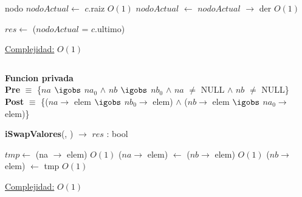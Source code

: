 \begin{Algoritmos}
\begin{algorithm}[H]
\begin{algorithmic}[1]
    \State nodo $nodoActual \gets$ $c$.raiz \Comment $O(1)$
        $nodoActual$ $\gets$ $nodoActual$ $\rightarrow$ der \Comment $O(1)$
    \EndWhile

    \State $res \gets$ ($nodoActual$ = $c$.ultimo)

    \medskip
    \Statex \underline{Complejidad:} $O(1)$
\end{algorithmic}
\end{algorithm}


$ $\newline

\textbf{Funcion privada}\\
\textbf{Pre} $\equiv$ \{$na$ $\igobs$ $na_0$ $\land$ $nb$ $\igobs$ $nb_0$ $\land$ $na$ $\neq$ NULL $\land$ $nb$ $\neq$ NULL\}\\%
\textbf{Post} $\equiv$ \{($na \to$ elem $\igobs$ $nb_0 \to$ elem) $\land$ ($nb \to$ elem $\igobs$ $na_0 \to$ elem)\}%
\begin{algorithm}[H]
{\textbf{iSwapValores}(, ) $\to$ $res$ : bool}
\begin{algorithmic}[1]

    \State $tmp \gets$ (na $\to$ elem) \Comment $O(1)$
    \State ($na \to$ elem) $\gets$ ($nb \to$ elem) \Comment $O(1)$
    \State ($nb \to$ elem) $\gets$ tmp \Comment $O(1)$

    \medskip
    \Statex \underline{Complejidad:} $O(1)$
\end{algorithmic}
\end{algorithm}





\end{Algoritmos}
